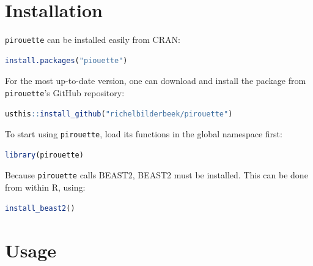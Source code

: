 \documentclass{article}
\begin{document}





\section{Installation}

\verb;pirouette; can be installed easily from CRAN:

\begin{lstlisting}[language=R, floatplacement=H]
install.packages("piouette")
\end{lstlisting}

For the most up-to-date version, 
one can download and install the package from \verb;pirouette;'s GitHub repository:

\begin{lstlisting}[language=R, floatplacement=H]
usthis::install_github("richelbilderbeek/pirouette")
\end{lstlisting}
To start using \verb;pirouette;, load its functions in the global namespace first:

\begin{lstlisting}[language=R, floatplacement=H]
library(pirouette)
\end{lstlisting}
Because \verb;pirouette; calls BEAST2, BEAST2 must be installed. 
This can be done from within R, using:

\begin{lstlisting}[language=R, floatplacement=H]
install_beast2()
\end{lstlisting}


\section{Usage}
\end{document}
